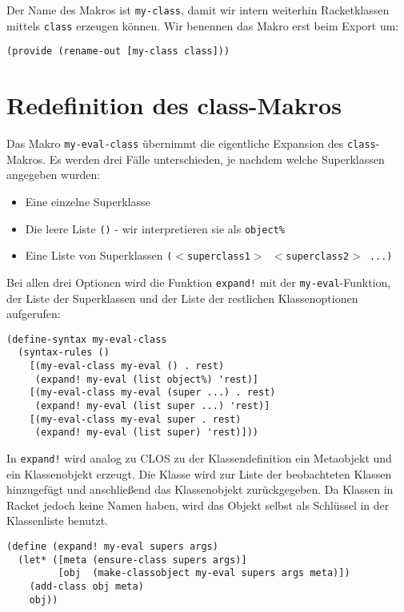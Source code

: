 Der Name des Makros ist \texttt{my-class}, damit wir intern weiterhin Racketklassen mittels \texttt{class} erzeugen können. Wir benennen das Makro erst beim Export um:

\begin{lstlisting}
(provide (rename-out [my-class class]))
\end{lstlisting}

\section{Redefinition des class-Makros}
Das Makro \texttt{my-eval-class} übernimmt die eigentliche Expansion des \texttt{class}-Makros. Es werden drei Fälle unterschieden, je nachdem welche Superklassen angegeben wurden:
\begin{itemize}
 \item Eine einzelne Superklasse 
 \item Die leere Liste \texttt{()} - wir interpretieren sie als \texttt{object\%}
 \item Eine Liste von Superklassen \texttt{($<$superclass1$>$ $<$superclass2$>$ ...)}
\end{itemize}

Bei allen drei Optionen wird die Funktion \texttt{expand!} mit der \texttt{my-eval}-Funktion, der Liste der Superklassen und der Liste der restlichen Klassenoptionen aufgerufen:

\begin{lstlisting}
(define-syntax my-eval-class
  (syntax-rules ()
    [(my-eval-class my-eval () . rest) 
     (expand! my-eval (list object%) 'rest)]
    [(my-eval-class my-eval (super ...) . rest)
     (expand! my-eval (list super ...) 'rest)]
    [(my-eval-class my-eval super . rest)
     (expand! my-eval (list super) 'rest)]))
\end{lstlisting}

In \texttt{expand!} wird analog zu CLOS zu der Klassendefinition ein Metaobjekt und ein Klassenobjekt erzeugt. Die Klasse wird zur Liste der beobachteten Klassen hinzugefügt und anschließend das Klassenobjekt zurückgegeben. Da Klassen in Racket jedoch keine Namen haben, wird das Objekt selbst als Schlüssel in der Klassenliste benutzt.

\begin{lstlisting}
(define (expand! my-eval supers args)
  (let* ([meta (ensure-class supers args)]
         [obj  (make-classobject my-eval supers args meta)])
    (add-class obj meta)
    obj))
\end{lstlisting}

